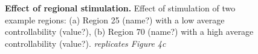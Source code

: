 \begin{figure}
 \caption{\textbf{Effect of regional stimulation.} Effect of stimulation of two example regions: (a) Region 25 (name?) with a low average controllability (value?),
 (b) Region 70 (name?) with a high average controllability (value?). \textit{replicates Figure 4c}} 
 \label{fig:functional-effect-examples}
\end{figure}


